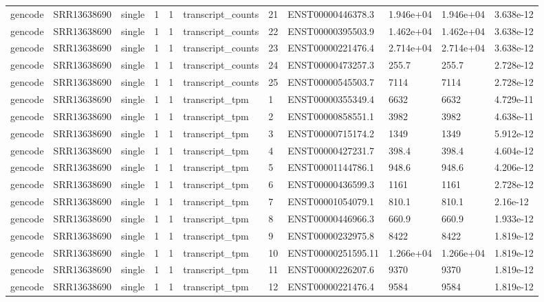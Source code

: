 \begin{tabular}{lllllllllll}
gencode & SRR13638690 & single & 1 & 1 & transcript\_counts & 21 & ENST00000446378.3 & 1.946e+04 & 1.946e+04 & 3.638e-12 \\
gencode & SRR13638690 & single & 1 & 1 & transcript\_counts & 22 & ENST00000395503.9 & 1.462e+04 & 1.462e+04 & 3.638e-12 \\
gencode & SRR13638690 & single & 1 & 1 & transcript\_counts & 23 & ENST00000221476.4 & 2.714e+04 & 2.714e+04 & 3.638e-12 \\
gencode & SRR13638690 & single & 1 & 1 & transcript\_counts & 24 & ENST00000473257.3 & 255.7 & 255.7 & 2.728e-12 \\
gencode & SRR13638690 & single & 1 & 1 & transcript\_counts & 25 & ENST00000545503.7 & 7114 & 7114 & 2.728e-12 \\
gencode & SRR13638690 & single & 1 & 1 & transcript\_tpm & 1 & ENST00000355349.4 & 6632 & 6632 & 4.729e-11 \\
gencode & SRR13638690 & single & 1 & 1 & transcript\_tpm & 2 & ENST00000858551.1 & 3982 & 3982 & 4.638e-11 \\
gencode & SRR13638690 & single & 1 & 1 & transcript\_tpm & 3 & ENST00000715174.2 & 1349 & 1349 & 5.912e-12 \\
gencode & SRR13638690 & single & 1 & 1 & transcript\_tpm & 4 & ENST00000427231.7 & 398.4 & 398.4 & 4.604e-12 \\
gencode & SRR13638690 & single & 1 & 1 & transcript\_tpm & 5 & ENST00001144786.1 & 948.6 & 948.6 & 4.206e-12 \\
gencode & SRR13638690 & single & 1 & 1 & transcript\_tpm & 6 & ENST00000436599.3 & 1161 & 1161 & 2.728e-12 \\
gencode & SRR13638690 & single & 1 & 1 & transcript\_tpm & 7 & ENST00001054079.1 & 810.1 & 810.1 & 2.16e-12 \\
gencode & SRR13638690 & single & 1 & 1 & transcript\_tpm & 8 & ENST00000446966.3 & 660.9 & 660.9 & 1.933e-12 \\
gencode & SRR13638690 & single & 1 & 1 & transcript\_tpm & 9 & ENST00000232975.8 & 8422 & 8422 & 1.819e-12 \\
gencode & SRR13638690 & single & 1 & 1 & transcript\_tpm & 10 & ENST00000251595.11 & 1.266e+04 & 1.266e+04 & 1.819e-12 \\
gencode & SRR13638690 & single & 1 & 1 & transcript\_tpm & 11 & ENST00000226207.6 & 9370 & 9370 & 1.819e-12 \\
gencode & SRR13638690 & single & 1 & 1 & transcript\_tpm & 12 & ENST00000221476.4 & 9584 & 9584 & 1.819e-12 \\

\end{tabular}

